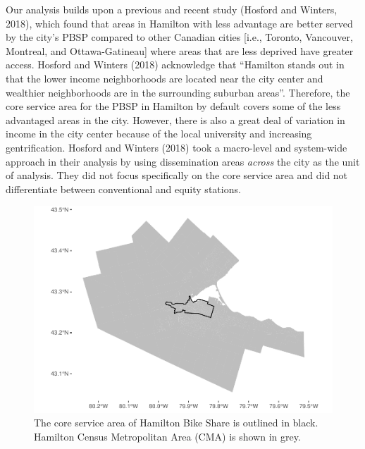 \documentclass[]{elsarticle} %
\begin{document}
Our analysis builds upon a previous and recent study (Hosford and
Winters, 2018), which found that areas in Hamilton with less advantage
are better served by the city's PBSP compared to other Canadian cities
{[}i.e., Toronto, Vancouver, Montreal, and Ottawa-Gatineau{]} where
areas that are less deprived have greater access. Hosford and Winters
(2018) acknowledge that ``Hamilton stands out in that the lower income
neighborhoods are located near the city center and wealthier
neighborhoods are in the surrounding suburban areas''. Therefore, the
core service area for the PBSP in Hamilton by default covers some of the
less advantaged areas in the city. However, there is also a great deal
of variation in income in the city center because of the local
university and increasing gentrification. Hosford and Winters (2018)
took a macro-level and system-wide approach in their analysis by using
dissemination areas \emph{across} the city as the unit of analysis. They
did not focus specifically on the core service area and did not
differentiate between conventional and equity stations.

\begin{figure}

{\centering \includegraphics[width=0.9\linewidth]{Bike-share-spatial-equity_files/figure-latex/hamilton-and-sobi-service-area-1} 

}

\caption{The core service area of Hamilton Bike Share is outlined in black. Hamilton Census Metropolitan Area (CMA) is shown in grey.}\label{fig:hamilton-and-sobi-service-area}
\end{figure}
\end{document}
